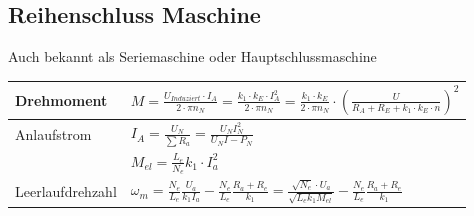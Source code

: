     \subsection{Reihenschluss Maschine}
    Auch bekannt als Seriemaschine oder Hauptschlussmaschine\\
        \renewcommand{\arraystretch}{2}
        \begin{tabular}[c]{ | p{6cm} | p{9cm} |}
            \hline
            Drehmoment &
            $ M=  \frac{U_{Induziert} \cdot I_A}{2 \cdot \pi n_N} = \frac{k_1 \cdot k_E \cdot I_A ^2}{2\cdot \pi n_N}= \frac{k_1 \cdot k_E}{2 \cdot \pi n_N}\cdot(\frac{U}{R_A + R_E + k_1 \cdot k_E \cdot n})^2$ \\
            \hline
            Anlaufstrom &
            $I_A=\frac{U_N}{\sum R_a}=\frac{U_N I_N^2}{U_N I-P_N}$ \\
            \hline
            & $M_{el}=\frac{L_e}{N_e}k_1\cdot I_a^2$\\
            \hline
            Leerlaufdrehzahl &
            $\omega_m=\frac{N_e}{L_e}\frac{U_a}{k_1I_a}-\frac{N_e}{L_e}\frac{R_a+R_e}{k_1}=\frac{\sqrt{N_e}\cdot
            U_a}{\sqrt{L_ek_1M_{el}}}-\frac{N_e}{L_e}\frac{R_a+R_e}{k_1}$\\
            \hline
        \end{tabular}
        \renewcommand{\arraystretch}{1.5}